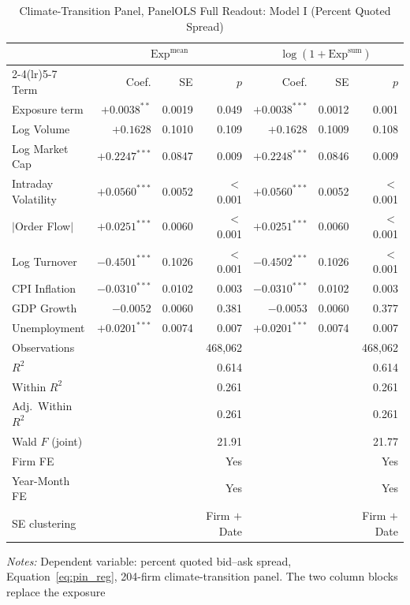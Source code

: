 \begin{table}[htbp]
\centering
\caption{Climate-Transition Panel, PanelOLS Full Readout: Model I (Percent Quoted Spread)}
\label{tab:v2_full_modelI}
\begin{threeparttable}
\small
\setlength{\tabcolsep}{4pt}
\begin{tabular}{l r r r r r r}
\toprule
 & \multicolumn{3}{c}{$\mathrm{Exp}^{\text{mean}}$} & \multicolumn{3}{c}{$\log(1+\mathrm{Exp}^{\text{sum}})$} \\
\cmidrule(lr){2-4}\cmidrule(lr){5-7}
Term & Coef. & SE & $p$ & Coef. & SE & $p$ \\
\midrule
Exposure term & $+0.0038^{**}$ & 0.0019 & 0.049 & $+0.0038^{***}$ & 0.0012 & 0.001 \\
Log Volume & $+0.1628$ & 0.1010 & 0.109 & $+0.1628$ & 0.1009 & 0.108 \\
Log Market Cap & $+0.2247^{***}$ & 0.0847 & 0.009 & $+0.2248^{***}$ & 0.0846 & 0.009 \\
Intraday Volatility & $+0.0560^{***}$ & 0.0052 & $<$0.001 & $+0.0560^{***}$ & 0.0052 & $<$0.001 \\
$|$Order Flow$|$ & $+0.0251^{***}$ & 0.0060 & $<$0.001 & $+0.0251^{***}$ & 0.0060 & $<$0.001 \\
Log Turnover & $-0.4501^{***}$ & 0.1026 & $<$0.001 & $-0.4502^{***}$ & 0.1026 & $<$0.001 \\
CPI Inflation & $-0.0310^{***}$ & 0.0102 & 0.003 & $-0.0310^{***}$ & 0.0102 & 0.003 \\
GDP Growth & $-0.0052$ & 0.0060 & 0.381 & $-0.0053$ & 0.0060 & 0.377 \\
Unemployment & $+0.0201^{***}$ & 0.0074 & 0.007 & $+0.0201^{***}$ & 0.0074 & 0.007 \\
\midrule
Observations & & & 468,062 & & & 468,062 \\
$R^2$ & & & 0.614 & & & 0.614 \\
Within $R^2$ & & & 0.261 & & & 0.261 \\
Adj.\ Within $R^2$ & & & 0.261 & & & 0.261 \\
Wald $F$ (joint) & & & 21.91 & & & 21.77 \\
Firm FE & & & Yes & & & Yes \\
Year-Month FE & & & Yes & & & Yes \\
SE clustering & & & Firm $+$ Date & & & Firm $+$ Date \\
\bottomrule
\end{tabular}
\begin{tablenotes}
\small
\item \textit{Notes:} Dependent variable: percent quoted bid--ask spread, Equation~\ref{eq:pin_reg}, 204-firm climate-transition panel. The two column blocks replace the exposure

\end{tablenotes}
\end{threeparttable}
\end{table}
